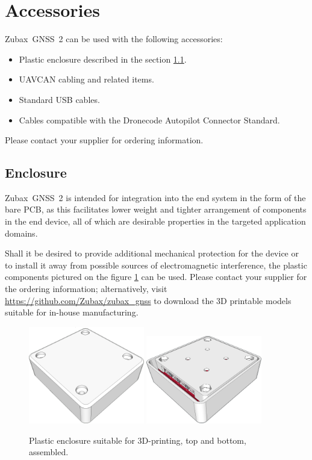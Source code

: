 \documentclass{zubaxdoc}
\begin{document}
\section{Accessories}

Zubax~GNSS~2 can be used with the following accessories:

\begin{itemize}
    \item Plastic enclosure described in the section \ref{sec:enclosure}.
    \item UAVCAN cabling and related items.
    \item Standard USB cables.
    \item Cables compatible with the Dronecode Autopilot Connector Standard.
\end{itemize}

Please contact your supplier for ordering information.

\subsection{Enclosure}\label{sec:enclosure}

Zubax~GNSS~2 is intended for integration into the end system in the form of the bare PCB,
as this facilitates lower weight and tighter arrangement of components
in the end device, all of which are desirable properties in the targeted application domains.

Shall it be desired to provide additional mechanical protection for the device
or to install it away from possible sources of electromagnetic interference,
the plastic components pictured on the figure \ref{enclosure} can be used.
Please contact your supplier for the ordering information;
alternatively, visit \url{https://github.com/Zubax/zubax_gnss} to download
the 3D printable models suitable for in-house manufacturing.

\begin{figure}[hbt]
	\centering
	\includegraphics[width=0.45\textwidth]{enclosure_assembled_top}
	\includegraphics[width=0.45\textwidth]{enclosure_assembled_bottom}
	\caption{Plastic enclosure suitable for 3D-printing, top and bottom, assembled.\label{enclosure}}
\end{figure}
\end{document}
